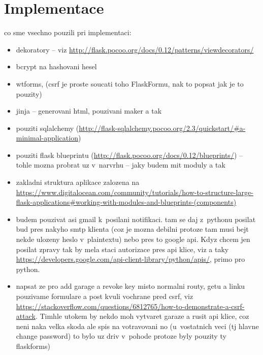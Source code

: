 \chapter{Implementace}
\label{sec:im}

co sme vsechno pouzili pri implementaci:

\begin{itemize}

\item dekoratory -- viz \url{http://flask.pocoo.org/docs/0.12/patterns/viewdecorators/}

\item bcrypt na hashovani hesel

\item wtforms, (csrf je proste soucati toho FlaskFormu, nak to popsat jak je to pouzity)

\item jinja -- generovani html, pouzivani maker a tak

\item pouziti sqlalchemy (\url{http://flask-sqlalchemy.pocoo.org/2.3/quickstart/#a-minimal-application})

\item pouziti flask blueprintu (\url{http://flask.pocoo.org/docs/0.12/blueprints/}) -- tohle mozna probrat uz v~narvrhu -- jaky budem mit moduly a tak

\item zakladni struktura aplikace zalozena na \url{https://www.digitalocean.com/community/tutorials/how-to-structure-large-flask-applications#working-with-modules-and-blueprints-(components)}

\item budem pouzivat asi gmail k~posilani notifikaci. tam se daj z~pythonu posilat bud pres nakyho smtp klienta (coz je mozna debilni protoze tam musi bejt nekde ulozeny heslo v~plaintextu) nebo pres to google api. Kdyz chcem jen posilat zpravy tak by mela staci autorizace pres api klice, viz \cite{email_api} a taky \url{https://developers.google.com/api-client-library/python/apis/}, primo pro python.

\item napsat ze pro add garage a revoke key misto normalni routy, getu a linku pouzivame formulare a post kvuli vochrane pred csrf, viz \url{https://stackoverflow.com/questions/6812765/how-to-demonstrate-a-csrf-attack}. Timhle utokem by nekdo moh vytvaret garaze a rusit api klice, coz neni naka velka skoda ale spis na votravovani no (u~vostatnich veci (tj hlavne change password) to bylo uz driv v~pohode protoze byly pouzity ty flaskforms)


\end{itemize}
